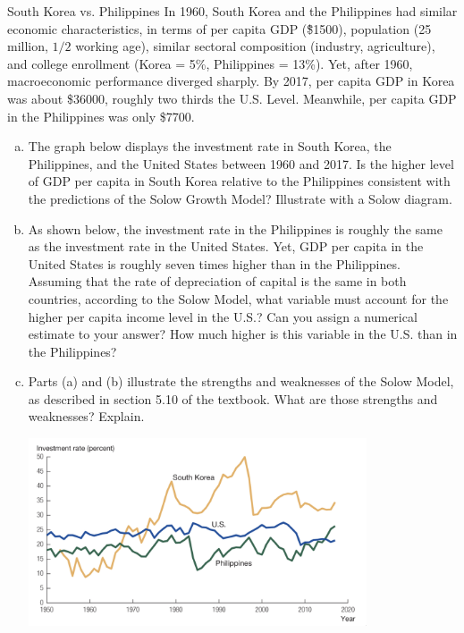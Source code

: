 \documentclass[8pt]{extarticle}
\title{}
\author{Avinash Iyer}
\date{}
\begin{document}
\begin{problem}{South Korea vs. Philippines}
  In 1960, South Korea and the Philippines had similar economic characteristics, in terms of per capita GDP (\~\$1500), population (25 million, $1/2$ working age), similar sectoral composition (industry, agriculture), and college enrollment (Korea = 5\%, Philippines = 13\%). Yet, after 1960, macroeconomic performance diverged sharply. By 2017, per capita GDP in Korea was about \$36000, roughly two thirds the U.S. Level. Meanwhile, per capita GDP in the Philippines was only \$7700.
  \begin{enumerate}[(a)]
    \item The graph below displays the investment rate in South Korea, the Philippines, and the United States between 1960 and 2017. Is the higher level of GDP per capita in South Korea relative to the Philippines consistent with the predictions of the Solow Growth Model? Illustrate with a Solow diagram.
    \item As shown below, the investment rate in the Philippines is roughly the same as the investment rate in the United States. Yet, GDP per capita in the United States is roughly seven times higher than in the Philippines. Assuming that the rate of depreciation of capital is the same in both countries, according to the Solow Model, what variable must account for the higher per capita income level in the U.S.? Can you assign a numerical estimate to your answer? How much higher is this variable in the U.S. than in the Philippines?
    \item Parts (a) and (b) illustrate the strengths and weaknesses of the Solow Model, as described in section 5.10 of the textbook. What are those strengths and weaknesses? Explain.
  \begin{center}
    \includegraphics[width=10cm]{ps3_img1}          
  \end{center}
  \end{enumerate}
\end{problem}
\end{document}
